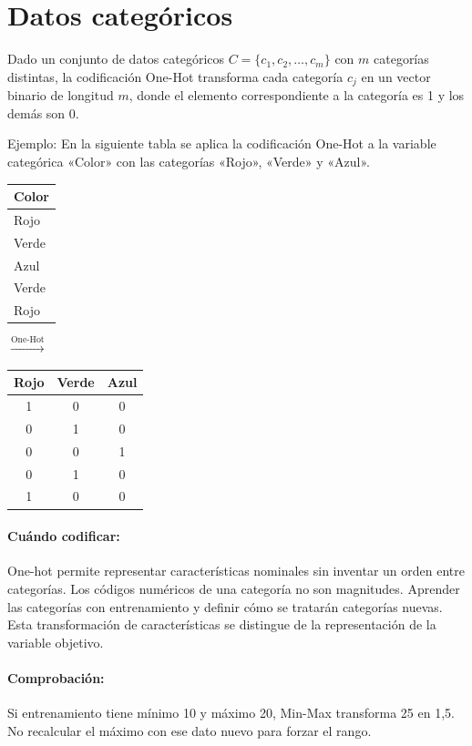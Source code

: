 \documentclass[a4,11pt]{aleph-notas}
\begin{document}
\newpage
\section{Datos categóricos}

\begin{defi}
    Dado un conjunto de datos categóricos \(C = \{c_1, c_2, \ldots, c_m\}\) con \(m\) categorías distintas, la codificación One-Hot transforma cada categoría \(c_j\) en un vector binario de longitud \(m\), donde el elemento correspondiente a la categoría es 1 y los demás son 0.
\end{defi}

Ejemplo: En la siguiente tabla se aplica la codificación One-Hot a la variable categórica «Color» con las categorías «Rojo», «Verde» y «Azul».
\begin{center}
    \begin{tabular}{l}
        \toprule
        Color \\
        \midrule
        Rojo \\
        Verde \\
        Azul \\
        Verde \\
        Rojo \\
        \bottomrule
    \end{tabular}
    \quad
    $\xrightarrow{\text{One-Hot}}$
    \quad
    \begin{tabular}{ccc}
        \toprule
        Rojo & Verde & Azul \\
        \midrule
        1 & 0 & 0 \\
        0 & 1 & 0 \\
        0 & 0 & 1 \\
        0 & 1 & 0 \\
        1 & 0 & 0 \\
        \bottomrule
    \end{tabular}
\end{center}

\paragraph{Cuándo codificar:} One-hot permite representar características nominales sin inventar un orden entre categorías. Los códigos numéricos de una categoría no son magnitudes. Aprender las categorías con entrenamiento y definir cómo se tratarán categorías nuevas. Esta transformación de características se distingue de la representación de la variable objetivo.

\paragraph{Comprobación:} Si entrenamiento tiene mínimo 10 y máximo 20, Min-Max transforma 25 en 1,5. No recalcular el máximo con ese dato nuevo para forzar el rango.
\end{document}

